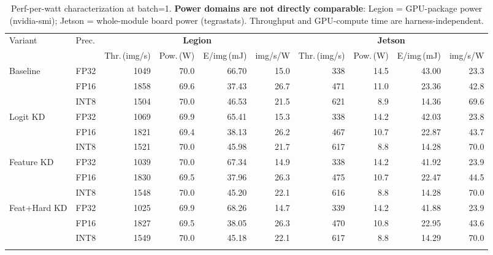 \begin{table}[t]
\centering
\caption{Perf-per-watt characterization at batch=1. \textbf{Power domains are not directly comparable}: Legion = GPU-package power (nvidia-smi); Jetson = whole-module board power (tegrastats). Throughput and GPU-compute time are harness-independent.}
\label{tab:ppw}
\begin{tabular}{llrrrrrrrr}
\toprule
Variant & Prec. & \multicolumn{4}{c}{\textbf{Legion}} & \multicolumn{4}{c}{\textbf{Jetson}} \\
\cmidrule(lr){3-6} \cmidrule(lr){7-10}
 &  & Thr.\,(img/s) & Pow.\,(W) & E/img\,(mJ) & img/s/W & Thr.\,(img/s) & Pow.\,(W) & E/img\,(mJ) & img/s/W \\
\midrule
Baseline & FP32 & 1049 & 70.0 & 66.70 & 15.0 & 338 & 14.5 & 43.00 & 23.3 \\
 & FP16 & 1858 & 69.6 & 37.43 & 26.7 & 471 & 11.0 & 23.36 & 42.8 \\
 & INT8 & 1504 & 70.0 & 46.53 & 21.5 & 621 & 8.9 & 14.36 & 69.6 \\
\addlinespace[2pt]
Logit KD & FP32 & 1069 & 69.9 & 65.41 & 15.3 & 338 & 14.2 & 42.03 & 23.8 \\
 & FP16 & 1821 & 69.4 & 38.13 & 26.2 & 467 & 10.7 & 22.87 & 43.7 \\
 & INT8 & 1521 & 70.0 & 45.98 & 21.7 & 617 & 8.8 & 14.28 & 70.0 \\
\addlinespace[2pt]
Feature KD & FP32 & 1039 & 70.0 & 67.34 & 14.9 & 338 & 14.2 & 41.92 & 23.9 \\
 & FP16 & 1830 & 69.5 & 37.96 & 26.3 & 475 & 10.7 & 22.47 & 44.5 \\
 & INT8 & 1548 & 70.0 & 45.20 & 22.1 & 616 & 8.8 & 14.28 & 70.0 \\
\addlinespace[2pt]
Feat+Hard KD & FP32 & 1025 & 69.9 & 68.26 & 14.7 & 339 & 14.2 & 41.88 & 23.9 \\
 & FP16 & 1827 & 69.5 & 38.05 & 26.3 & 470 & 10.8 & 22.95 & 43.6 \\
 & INT8 & 1549 & 70.0 & 45.18 & 22.1 & 617 & 8.8 & 14.29 & 70.0 \\
\addlinespace[2pt]
\bottomrule
\end{tabular}
\end{table}
